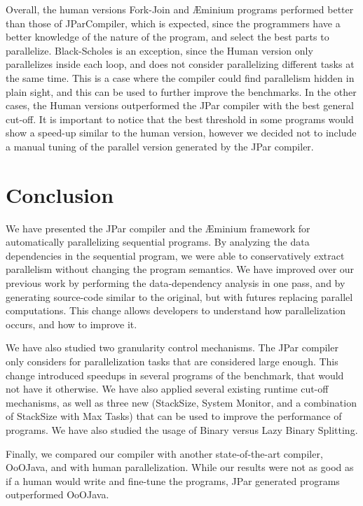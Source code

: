 \documentclass[smallextended]{svjour3}
\begin{document}
Overall, the human versions Fork-Join and Æminium programs performed better than those of JParCompiler, which is expected, since the programmers have a better knowledge of the nature of the program, and select the best parts to parallelize. Black-Scholes is an exception, since the Human version only parallelizes inside each loop, and does not consider parallelizing different tasks at the same time. This is a case where the compiler could find parallelism hidden in plain sight, and this can be used to further improve the benchmarks. In the other cases, the Human versions outperformed the JPar compiler with the best general cut-off. It is important to notice that the best threshold in some programs would show a speed-up similar to the human version, however we decided not to include a manual tuning of the parallel version generated by the JPar compiler.

\section{Conclusion}
\label{sec:conclusion}

We have presented the JPar compiler and the Æminium framework for automatically parallelizing sequential programs. By analyzing the data dependencies in the sequential program, we were able to conservatively extract parallelism without changing the program semantics. We have improved over our previous work by performing the data-dependency analysis in one pass, and by generating source-code similar to the original, but with futures replacing parallel computations. This change allows developers to understand how parallelization occurs, and how to improve it.

We have also studied two granularity control mechanisms. The JPar compiler only considers for parallelization tasks that are considered large enough. This change introduced speedups in several programs of the benchmark, that would not have it otherwise. We have also applied several existing runtime cut-off mechanisms, as well as three new (StackSize, System Monitor, and a combination of StackSize with Max Tasks) that can be used to improve the performance of programs. We have also studied the usage of Binary versus Lazy Binary Splitting.

Finally, we compared our compiler with another state-of-the-art compiler, OoOJava, and with human parallelization. While our results were not as good as if a human would write and fine-tune the programs, JPar generated programs outperformed OoOJava.
\end{document}
